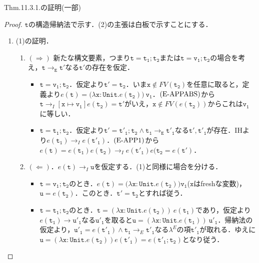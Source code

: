 \documentclass[9pt]{beamer}
\begin{document}
\begin{frame}{Thm.11.3.1.の証明(一部)}
    \begin{proof}
       $\mathtt{t}$の構造帰納法で示す．(2)の主張は白板で示すことにする．
        \begin{enumerate}
        \item (1)の証明．\begin{enumerate}
        \item $(\Rightarrow)$ 新たな構文要素，つまり$\mathtt{t = t_{1};t_{2}}$または$\mathtt{t = v_{1};t_{2}}$の場合を考え，$\mathtt{t\rightarrow_{E} t'}$なる$\mathtt{t'}$の存在を仮定．\begin{itemize}
        \item $\mathtt{t = v_{1};t_{2}}$．仮定より$\mathtt{t' = t_{2}}$．いま$\mathtt{x}\notin FV(\mathtt{t_{2}})$を任意に取ると，定義より$e(\mathtt{t}) = \mathtt{(\lambda x: Unit. }e\mathtt{(t_{2}))\ v_{1}}$．$\text{\rm(E-APPABS)}$から$\mathtt{t}\rightarrow_{I}\left[\mathtt{x\mapsto v_{1}}\right]e\mathtt{(t_{2})} = \mathtt{t'}$がいえ，$\mathtt{x\notin}FV(e(\mathtt{t_{2}}))$からこれは$\mathtt{v_{1}}$に等しい．
        \item $\mathtt{t = t_{1};t_{2}}$．仮定より$\mathtt{t' = t'_{1};t_{2}}\land \mathtt{t_{1}\rightarrow_{E}t'_{1}}$なる$\mathtt{t', t'_{1}}$が存在．IHより$e(\mathtt{t_{1}}) \rightarrow_{I} e(\mathtt{t'_{1}})$．$\text{\rm{(E-APP1)}}$から$e(\mathtt{t}) = e(\mathtt{t_{1}})e(\mathtt{t_{2}})\rightarrow_{I} e(\mathtt{t'_{1}})e(\mathtt{t_{2}} = e(\mathtt{t'})$．
        \end{itemize}
        \item $(\Leftarrow)$．$e(\mathtt{t})\rightarrow_{I}\mathtt{u}$を仮定する．(1)と同様に場合を分ける．\begin{itemize}
        \item $\mathtt{t = v_{1};t_{2}}$のとき．$e(\mathtt{t}) = \mathtt{(\lambda x:Unit. }e\mathtt{(t_{2}))v_{1}}$($\mathtt{x}$はfreshな変数)，$\mathtt{u} = e(\mathtt{t_{2}})$．このとき．$\mathtt{t' = t_{2}}$とすれば従う．
        \item $\mathtt{t = t_{1};t_{2}}$のとき．$\mathtt{t} = (\mathtt{\lambda x:Unit.}e (\mathtt{t_{2}}))\ e(\mathtt{t_{1}})$であり，仮定より$e(\mathtt{t_{1}})\rightarrow \mathtt{u'_{1}}$なる$\mathtt{u'_{1}}$を取ると$\mathtt{u} = (\mathtt{\lambda x:Unit.}e(\mathtt{t_{1}}))\ \mathtt{u'_{1}}$．帰納法の仮定より，$\mathtt{u'_{1}} = e(\mathtt{t'_{1}})\land \mathtt{t_{1}}\rightarrow_{E} \mathtt{t'_{1}}$なる$\lambda^{E}$の項$\mathtt{t'_{1}}$が取れる．ゆえに$\mathtt{u} = (\mathtt{\lambda x: Unit.}e(\mathtt{t_{2}}))e(\mathtt{t'_{1}}) = e(\mathtt{t'_{1};t_{2}})$となり従う．
        \end{itemize}
        \end{enumerate}
        \end{enumerate}
    \end{proof}
\end{frame}
\end{document}
